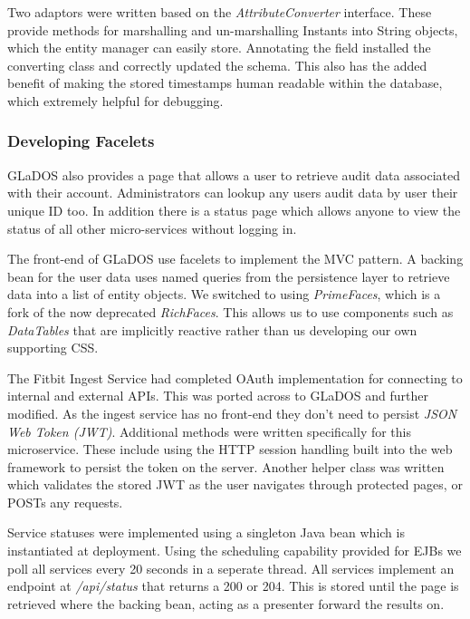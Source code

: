         \par
        Two adaptors were written based on the \textit{AttributeConverter} interface. These provide methods for marshalling and un-marshalling Instants into String objects, which the entity manager can easily store. Annotating the field installed the converting class and correctly updated the schema. This also has the added benefit of making the stored timestamps human readable within the database, which extremely helpful for debugging.

        \subsubsection{Developing Facelets}
        \par
        GLaDOS also provides a page that allows a user to retrieve audit data associated with their account. Administrators can lookup any users audit data by user their unique ID too. In addition there is a status page which allows anyone to view the status of all other micro-services without logging in.

        \par
        The front-end of GLaDOS use facelets to implement the MVC pattern. A backing bean for the user data uses named queries from the persistence layer to retrieve data into a list of entity objects. We switched to using \textit{PrimeFaces}\cite{Primefaces}, which is a fork of the now deprecated \textit{RichFaces}. This allows us to use components such as \textit{DataTables} that are implicitly reactive rather than us developing our own supporting CSS.

        \par
        The Fitbit Ingest Service had completed OAuth implementation for connecting to internal and external APIs. This was ported across to GLaDOS and further modified. As the ingest service has no front-end they don't need to persist \textit{JSON Web Token (JWT)}. Additional methods were written specifically for this microservice. These include using the HTTP session handling built into the web framework to persist the token on the server. Another helper class was written which validates the stored JWT as the user navigates through protected pages, or POSTs any requests.

        \par
        Service statuses were implemented using a singleton Java bean which is instantiated at deployment. Using the scheduling capability provided for EJBs we poll all services every 20 seconds in a seperate thread. All services implement an endpoint at \textit{/api/status} that returns a 200 or 204. This is stored until the page is retrieved where the backing bean, acting as a presenter forward the results on.

